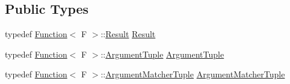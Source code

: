 \subsection*{Public Types}
\begin{DoxyCompactItemize}
\item 
typedef \hyperlink{structtesting_1_1internal_1_1_function}{Function}$<$ F $>$\+::\hyperlink{classtesting_1_1internal_1_1_function_mocker_base_aa50abc4055b4d3a14ad64c317bccec8d}{Result} \hyperlink{classtesting_1_1internal_1_1_function_mocker_base_aa50abc4055b4d3a14ad64c317bccec8d}{Result}
\item 
typedef \hyperlink{structtesting_1_1internal_1_1_function}{Function}$<$ F $>$\+::\hyperlink{classtesting_1_1internal_1_1_function_mocker_base_a336432a07e544af4ffb8103603471ca3}{Argument\+Tuple} \hyperlink{classtesting_1_1internal_1_1_function_mocker_base_a336432a07e544af4ffb8103603471ca3}{Argument\+Tuple}
\item 
typedef \hyperlink{structtesting_1_1internal_1_1_function}{Function}$<$ F $>$\+::\hyperlink{classtesting_1_1internal_1_1_function_mocker_base_ab790bcb1dcf57fa6659365386723ae5a}{Argument\+Matcher\+Tuple} \hyperlink{classtesting_1_1internal_1_1_function_mocker_base_ab790bcb1dcf57fa6659365386723ae5a}{Argument\+Matcher\+Tuple}
\end{DoxyCompactItemize}
